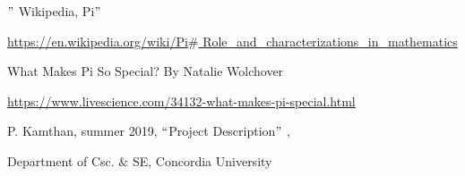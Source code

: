 \documentclass[12pt]{article}
\begin{document}
\begin{justify}
[4]$"$ Wikipedia, Pi$"$ 
\end{justify}\par

\begin{justify}
 \href{https://en.wikipedia.org/wiki/Pi}{https://en.wikipedia.org/wiki/Pi$\#$ Role\_and\_characterizations\_in\_mathematics}
\end{justify}\par

\begin{justify}
[5] What Makes Pi So Special? By Natalie Wolchover
\end{justify}\par

\begin{justify}
\href{https://www.livescience.com/34132-what-makes-pi-special.html}{https://www.livescience.com/34132-what-makes-pi-special.html}
\end{justify}\par

\begin{justify}
[6] P. Kamthan, summer 2019, $``$Project Description$"$ ,
\end{justify}\par

\begin{justify}
Department of Csc. $\&$  SE, Concordia University
\end{justify}\par


\vspace{\baselineskip}

\vspace{\baselineskip}

\vspace{\baselineskip}

\vspace{\baselineskip}
\setlength{\parskip}{2.04pt}
\begin{justify}
\ \ \ \ \ \  
\end{justify}\par


\vspace{\baselineskip}

\vspace{\baselineskip}

\vspace{\baselineskip}
\setlength{\parskip}{8.04pt}

\printbibliography
\end{document}

